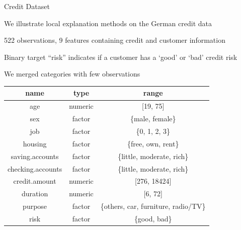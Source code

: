 \documentclass[10pt,compress,t,notes=noshow, xcolor=table]{beamer}
\begin{document}
\begin{framev}[align=top]{Credit Dataset}
\begin{itemizeM}
\item We illustrate local explanation methods on the German credit data
\item 522 observations, 9 features containing credit and customer information
\item Binary target ``risk'' indicates if a customer has a `good' or `bad' credit risk
\item We merged categories with few observations
\end{itemizeM}
\begin{center}
\begin{footnotesize}
\begin{tabular}{ccc}
\toprule
name & type & range\\
\midrule
age & numeric & [19, 75]\\
sex & factor & \{male, female\}\\
job & factor & \{0, 1, 2, 3\}\\
housing & factor & \{free, own, rent\}\\
saving.accounts & factor & \{little, moderate, rich\}\\
checking.accounts & factor & \{little, moderate, rich\}\\
credit.amount & numeric & [276, 18424]\\
duration & numeric & [6, 72]\\
purpose & factor & \{others, car, furniture, radio/TV\}\\
risk & factor & \{good, bad\}\\
\bottomrule
\end{tabular}
\end{footnotesize}
\end{center}
\end{framev}

\endlecture
\end{document}
